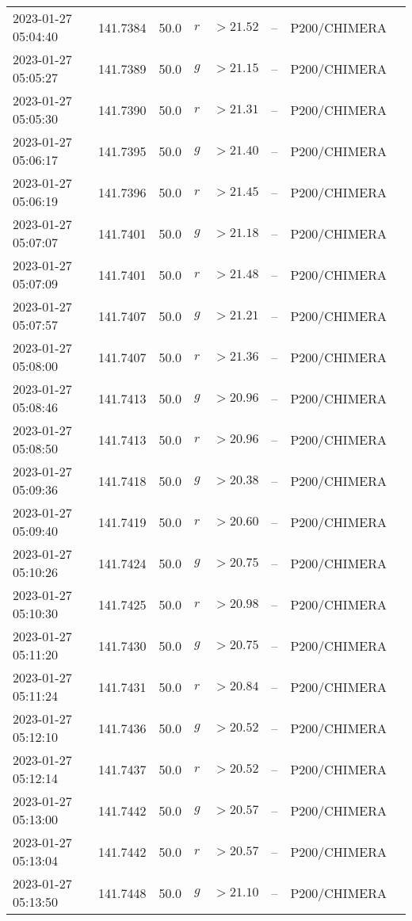 \documentclass{nature_plusfigure}
\begin{document}
\begin{supplement}
\begin{center}
\begin{longtable}{llllllll}
2023-01-27 05:04:40 & 141.7384 & 50.0 & $r$ & $>21.52$ & -- & P200/CHIMERA &  \\ 
2023-01-27 05:05:27 & 141.7389 & 50.0 & $g$ & $>21.15$ & -- & P200/CHIMERA &  \\ 
2023-01-27 05:05:30 & 141.7390 & 50.0 & $r$ & $>21.31$ & -- & P200/CHIMERA &  \\ 
2023-01-27 05:06:17 & 141.7395 & 50.0 & $g$ & $>21.40$ & -- & P200/CHIMERA &  \\ 
2023-01-27 05:06:19 & 141.7396 & 50.0 & $r$ & $>21.45$ & -- & P200/CHIMERA &  \\ 
2023-01-27 05:07:07 & 141.7401 & 50.0 & $g$ & $>21.18$ & -- & P200/CHIMERA &  \\ 
2023-01-27 05:07:09 & 141.7401 & 50.0 & $r$ & $>21.48$ & -- & P200/CHIMERA &  \\ 
2023-01-27 05:07:57 & 141.7407 & 50.0 & $g$ & $>21.21$ & -- & P200/CHIMERA &  \\ 
2023-01-27 05:08:00 & 141.7407 & 50.0 & $r$ & $>21.36$ & -- & P200/CHIMERA &  \\ 
2023-01-27 05:08:46 & 141.7413 & 50.0 & $g$ & $>20.96$ & -- & P200/CHIMERA &  \\ 
2023-01-27 05:08:50 & 141.7413 & 50.0 & $r$ & $>20.96$ & -- & P200/CHIMERA &  \\ 
2023-01-27 05:09:36 & 141.7418 & 50.0 & $g$ & $>20.38$ & -- & P200/CHIMERA &  \\ 
2023-01-27 05:09:40 & 141.7419 & 50.0 & $r$ & $>20.60$ & -- & P200/CHIMERA &  \\ 
2023-01-27 05:10:26 & 141.7424 & 50.0 & $g$ & $>20.75$ & -- & P200/CHIMERA &  \\ 
2023-01-27 05:10:30 & 141.7425 & 50.0 & $r$ & $>20.98$ & -- & P200/CHIMERA &  \\ 
2023-01-27 05:11:20 & 141.7430 & 50.0 & $g$ & $>20.75$ & -- & P200/CHIMERA &  \\ 
2023-01-27 05:11:24 & 141.7431 & 50.0 & $r$ & $>20.84$ & -- & P200/CHIMERA &  \\ 
2023-01-27 05:12:10 & 141.7436 & 50.0 & $g$ & $>20.52$ & -- & P200/CHIMERA &  \\ 
2023-01-27 05:12:14 & 141.7437 & 50.0 & $r$ & $>20.52$ & -- & P200/CHIMERA &  \\ 
2023-01-27 05:13:00 & 141.7442 & 50.0 & $g$ & $>20.57$ & -- & P200/CHIMERA &  \\ 
2023-01-27 05:13:04 & 141.7442 & 50.0 & $r$ & $>20.57$ & -- & P200/CHIMERA &  \\ 
2023-01-27 05:13:50 & 141.7448 & 50.0 & $g$ & $>21.10$ & -- & P200/CHIMERA &  \\ 

\end{longtable}
\end{center}
\end{supplement}
\end{document}

